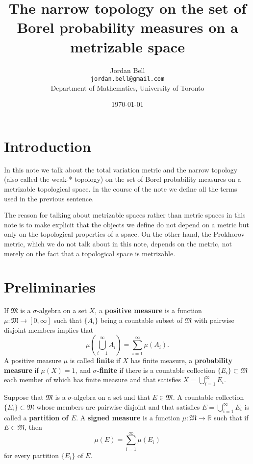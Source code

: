 \documentclass{article}
\theoremstyle{definition}
\begin{document}
\title{The narrow topology on the set of Borel probability measures on a metrizable space}
\author{Jordan Bell\\ \texttt{jordan.bell@gmail.com}\\Department of Mathematics, University of Toronto}
\date{\today}

\maketitle

\section{Introduction}
In this note we talk about the total variation metric and the narrow topology (also called the weak-* topology) on the set of Borel probability measures on a metrizable topological space.
In the course of the note we define all the terms used in the previous sentence. 

The reason for talking about metrizable spaces rather than metric spaces in this note is to make explicit that the objects we define do not depend on a metric but only on the topological
properties of a space. On the other hand, the Prokhorov metric, which we do not talk about in this note, depends on the metric, not merely on the fact
that a topological space is metrizable.

\section{Preliminaries}
If $\mathfrak{M}$ is a $\sigma$-algebra on a set $X$, a \textbf{positive measure} is a function
$\mu:\mathfrak{M} \to [0,\infty]$ such that $\{A_i\}$ being a countable subset of $\mathfrak{M}$ with pairwise disjoint
members implies that 
\[
\mu\left( \bigcup_{i=1}^\infty A_i\right) = \sum_{i=1}^\infty \mu(A_i).
\]
A positive measure $\mu$ is called \textbf{finite} if $X$ has finite measure, a \textbf{probability measure} if $\mu(X)=1$, and \textbf{$\sigma$-finite}
if there is a countable collection $\{E_i\} \subset \mathfrak{M}$ each member of which has finite measure and that satisfies  $X = \bigcup_{i=1}^\infty E_i$.



Suppose that $\mathfrak{M}$ is a $\sigma$-algebra on a set and that $E \in \mathfrak{M}$. 
A countable collection $\{E_i\} \subset \mathfrak{M}$ whose members are pairwise disjoint and that satisfies $E = \bigcup_{i=1}^\infty E_i$ is called
a \textbf{partition of $E$}. A \textbf{signed measure} is a function $\mu:\mathfrak{M} \to \mathbb{R}$ such that if
$E \in \mathfrak{M}$, then
\begin{equation}
\mu(E) = \sum_{i=1}^\infty \mu(E_i)
\label{unordered}
\end{equation}
for every partition $\{E_i\}$ of $E$. 
\end{document}
